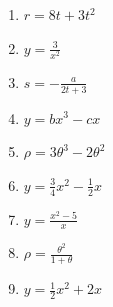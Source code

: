 \begin{enumerate}
\item
$r = 8t + 3t^2$ %

\item
$y = \frac{3}{x^2}$ %

\item
$s = -\frac{a}{2t + 3}$ %

\item
$y = bx^3 - cx$ %



\item
$\rho = 3\theta^3 - 2\theta^2$ %

\item
$y = \frac{3}{4}x^2 - \frac{1}{2}x$ %

\item
$y = \frac{x^2 - 5}{x}$ %

\item
$\rho = \frac{\theta^2}{1 + \theta}$ %

\item
$y = \frac{1}{2}x^2 + 2x$ %


\end{enumerate}
